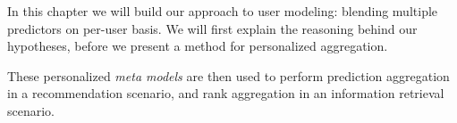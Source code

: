 In this chapter we will build our approach to user modeling:
blending multiple predictors on per-user basis.
We will first explain the reasoning behind our hypotheses,
before we present a method for personalized aggregation.

These personalized \emph{meta models} are then used to perform prediction aggregation in a recommendation scenario,
and rank aggregation in an information retrieval scenario.






